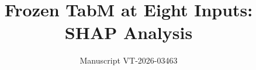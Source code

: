 \documentclass[journal]{IEEEtran}
\begin{document}
\title{Frozen TabM at Eight Inputs: SHAP Analysis}
\author{Manuscript VT-2026-03463}
\maketitle



\end{document}
